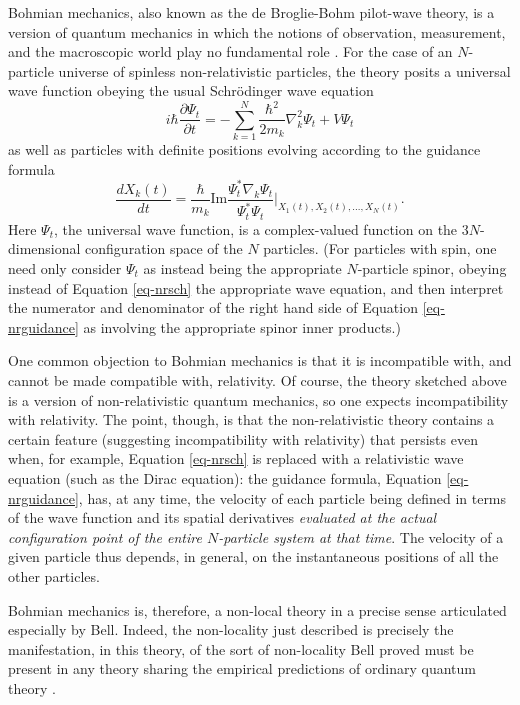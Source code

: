 \documentclass[12pt]{article}
\begin{document}
Bohmian mechanics, also known as the de Broglie-Bohm pilot-wave
theory, is a version of quantum mechanics in which the notions of 
observation, measurement, and the macroscopic world play no
fundamental role \cite{bohm93,holland93b,duerr09,duerr12}.  For the case of an $N$-particle universe of
spinless non-relativistic particles, the theory posits a universal
wave function obeying the usual Schr\"odinger wave equation
\begin{equation}
i \hbar \frac{\partial \Psi_t}{\partial t} = -\sum_{k=1}^{N}
\frac{\hbar^2}{2 m_k} \nabla_k^2 \Psi_t + V \Psi_t
\label{eq-nrsch}
\end{equation}
as well as particles with definite positions evolving according to the
guidance formula
\begin{equation}
\frac{dX_k(t)}{dt} = \frac{\hbar}{m_k} \text{Im} \frac{\Psi^*_t \nabla_k
  \Psi_t}{\Psi^*_t \Psi_t} \big|_{X_1(t), X_2(t), ... , X_N(t)}.
\label{eq-nrguidance}
\end{equation}
Here $\Psi_t$, the universal wave function, is a 
complex-valued function on the $3N$-dimensional configuration space of
the $N$ particles.  (For particles with spin, one need only consider
$\Psi_t$ as instead being the appropriate $N$-particle spinor, obeying
instead of Equation \eqref{eq-nrsch} the appropriate wave equation,
and then
interpret the numerator and denominator of the right hand side of
Equation \eqref{eq-nrguidance} as involving the appropriate spinor
inner products.)

One common objection to Bohmian mechanics is that it is  incompatible with, and cannot be made
compatible with, relativity.  Of course, the theory sketched above is
a version of non-relativistic quantum mechanics, so one expects
incompatibility with relativity.  The point, though, is that the
non-relativistic theory contains a certain feature (suggesting
incompatibility with relativity) that persists even when, for example,
Equation \eqref{eq-nrsch} is replaced with a relativistic wave
equation (such as the Dirac equation):  the guidance formula, Equation
\eqref{eq-nrguidance}, has, at any time, the velocity of each particle being defined
in terms of the wave function and its spatial derivatives \emph{evaluated
  at the actual configuration point of the entire $N$-particle system
  at that time}.  The velocity of a given
particle thus depends, in general, on the instantaneous positions of all
the other particles.  

Bohmian mechanics is, therefore, a non-local theory in a precise sense
articulated especially by Bell.  Indeed, the non-locality just
described is precisely the manifestation, in this theory, of the sort
of non-locality Bell proved must be present in any theory sharing the
empirical predictions of ordinary quantum theory \cite{bell87a,goldstein11}.  
\end{document}
